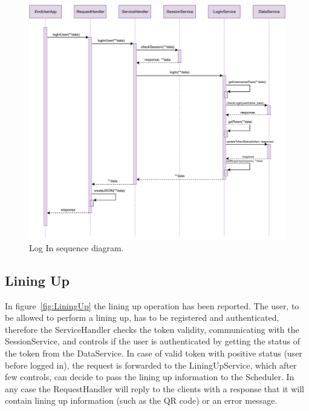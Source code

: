 \begin{figure}[H]
    \centering
    \includegraphics[width=1.0\textwidth]{images/logIn_sequence_diagram.pdf}
    \caption{Log In sequence diagram.}\label{fig:LogIn}
\end{figure}

\subsection{Lining Up}

In figure~\ref{fig:LiningUp} the lining up operation has been reported.
The user, to be allowed to perform a lining up, has to be registered and authenticated, therefore the ServiceHandler checks the token validity, communicating with the SessionService, and controls if the user is authenticated by getting the status of the token from the DataService.
In case of valid token with positive status (user before logged in), the request is forwarded to the LiningUpService, which after few controls, can decide to pass the lining up information to the Scheduler.
In any case the RequestHandler will reply to the clients with a response that it will contain lining up information (such as the QR code) or an error message.

